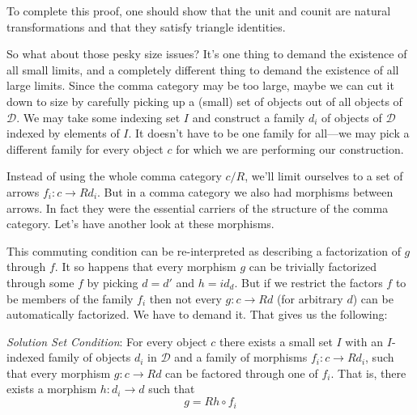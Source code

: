 \documentclass[11pt]{amsart}
\begin{document}
To complete this proof, one should show that the unit and counit are natural transformations and that they satisfy triangle identities. 

So what about those pesky size issues? It's one thing to demand the existence of all small limits, and a completely different thing to demand the existence of all large limits. Since the comma category may be too large, maybe we can cut it down to size by carefully picking up a (small) set of objects out of all objects of $\mathcal D$. We may take some indexing set $I$ and construct a family $d_i$ of objects of $\mathcal D$ indexed by elements of $I$. It doesn't have to be one family for all---we may pick a different family for every object $c$ for which we are performing our construction. 

Instead of using the whole comma category $c/R$, we'll limit ourselves to a set of arrows $f_i \colon c \to R d_i$. But in a comma category we also had morphisms between arrows. In fact they were the essential carriers of the structure of the comma category. Let's have another look at these morphisms.

\begin{figure}[H]
\centering
\end{figure}

This commuting condition can be re-interpreted as describing a factorization of $g$ through $f$. It so happens that every morphism $g$ can be trivially factorized through some $f$ by  picking $d = d'$ and $h = id_d$. But if we restrict the factors $f$ to be members of the family $f_i$ then not every $g \colon c \to R d$  (for arbitrary $d$) can be automatically factorized. We have to demand it. That gives us the following:

\emph{Solution Set Condition}: For every object $c$ there exists a small set $I$ with an $I$-indexed family of objects $d_i$ in $\mathcal D$ and a family of morphisms $f_i \colon c \to R d_i$, such that every morphism $g \colon c \to R d$ can be factored through one of $f_i$. That is, there exists a morphism $h \colon d_i \to d$ such that
\[g = R h \circ f_i \]
\end{document}
